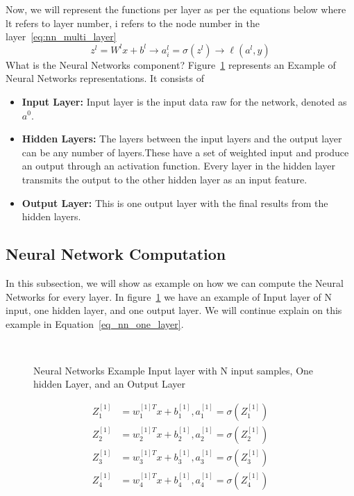 Now, we will represent the functions per layer as per the equations below where lt refers to layer number, i refers to the node number in the layer~\eqref{eq:nn_multi_layer}%
%
\begin{equation}\label{eq:nn_multi_layer}
\boxed{z^l = W^l x + b^l} \longrightarrow \boxed{a_i^l = \sigma(z^l)} \longrightarrow \boxed{\ell(a^l,y)}
\end{equation}%
%
What is the Neural Networks component?
Figure~\ref{Fig:NNExample} represents an Example of Neural Networks representations. It consists of

\begin{itemize}
\item \textbf{Input Layer:} Input layer is the input data raw for the network, denoted as $a^0$.
\item \textbf{Hidden Layers:} The layers between the input layers and the output layer can be any number of layers.These have a set of weighted input and produce an output through an activation function. Every layer in the hidden layer transmits the output to the other hidden layer as an input feature.
\item \textbf{Output Layer:} This is one output layer with the final results from the hidden layers.
\end{itemize}

\subsection{Neural Network Computation}

In this subsection, we will show as example on how we can compute the Neural Networks for every layer. In figure~\ref{Fig:NNExample} we have an example of Input layer of N input, one hidden layer, and one output layer. We will continue explain on this example in Equation~\eqref{eq_nn_one_layer}.%
\begin{figure}[!t]

\caption{Neural Networks Example Input layer with N input samples, One hidden Layer, and an Output Layer}~\label{Fig:NNExample}
\end{figure}%
\begin{subequations}\label{eq_nn_one_layer}
\begin{align}
Z_1^{[1]} & = w_1^{[1]T} x + b_1^{[1]} , a_1^{[1]} = \sigma(Z_1^{[1]}) \\
Z_2^{[1]} & = w_2^{[1]T} x + b_2^{[1]} , a_2^{[1]} = \sigma(Z_2^{[1]})\\
Z_3^{[1]} & = w_3^{[1]T} x + b_3^{[1]} , a_3^{[1]} = \sigma(Z_3^{[1]})\\
Z_4^{[1]} & = w_4^{[1]T} x + b_4^{[1]} , a_4^{[1]} = \sigma(Z_4^{[1]})
\end{align}
\end{subequations}%

